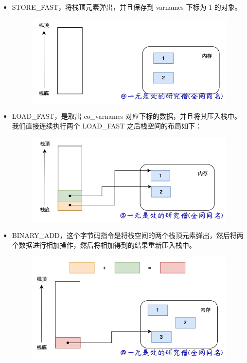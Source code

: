 \begin{itemize}
\item STORE\_FAST，将栈顶元素弹出，并且保存到 varnames 下标为 1 的对象。 

    \begin{figure}[H]
        \centering
            \includegraphics[scale=.2]{images/42-codeobject.png}
						\caption{ }
        \label{fig:my_label}
    \end{figure}
    
\item LOAD\_FAST，是取出 co\_varnames 对应下标的数据，并且将其压入栈中。我们直接连续执行两个 LOAD\_FAST 之后栈空间的布局如下： 

    \begin{figure}[H]
        \centering
            \includegraphics[scale=.2]{images/43-codeobject.png}
						\caption{ }
        \label{fig:my_label}
    \end{figure}
    
\item BINARY\_ADD，这个字节码指令是将栈空间的两个栈顶元素弹出，然后将两个数据进行相加操作，然后将相加得到的结果重新压入栈中。 

    \begin{figure}[H]
        \centering
            \includegraphics[scale=.2]{images/44-codeobject.png}
						\caption{ }
        \label{fig:my_label}
    \end{figure}
    

\end{itemize}

